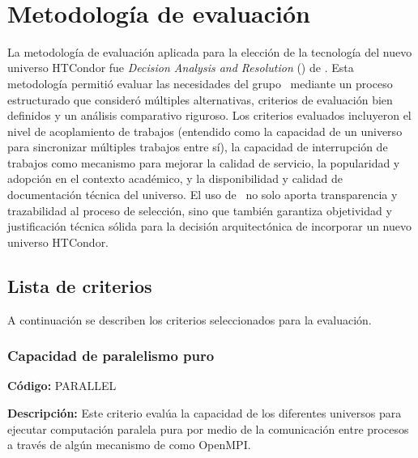 \label{cap:dar}
\mbox{}\\


\section{Metodología de evaluación}

La metodología de evaluación aplicada para la elección de la tecnología del nuevo universo HTCondor fue \textit{Decision Analysis and Resolution} (\DAR) de \CMMI \citep{CMMIInstitute2010}. Esta metodología permitió evaluar las necesidades del grupo \GRID\ mediante un proceso estructurado que consideró múltiples alternativas, criterios de evaluación bien definidos y un análisis comparativo riguroso. Los criterios evaluados incluyeron el nivel de acoplamiento de trabajos (entendido como la capacidad de un universo para sincronizar múltiples trabajos entre sí), la capacidad de interrupción de trabajos como mecanismo para mejorar la calidad de servicio, la popularidad y adopción en el contexto académico, y la disponibilidad y calidad de documentación técnica del universo. El uso de \DAR\ no solo aporta transparencia y trazabilidad al proceso de selección, sino que también garantiza objetividad y justificación técnica sólida para la decisión arquitectónica de incorporar un nuevo universo HTCondor.

\subsection{Lista de criterios}
A continuación se describen los criterios seleccionados para la evaluación.

\subsubsection{Capacidad de paralelismo puro}
\textbf{Código:} PARALLEL

\textbf{Descripción:} Este criterio evalúa la capacidad de los diferentes universos para ejecutar computación paralela pura por medio de la comunicación entre procesos a través de algún mecanismo de \MPI como OpenMPI.

